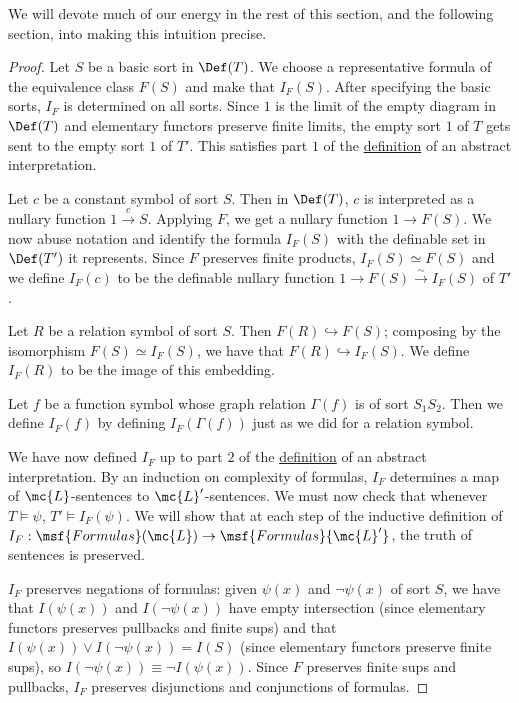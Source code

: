 \documentclass[11pt]{article}
\begin{document}
We will devote much of our energy in the rest of this section, and the following section, into making this intuition precise.


\begin{proof}
  Let $S$ be a basic sort in $\Def(T)$. We choose a representative formula of the equivalence class $F(S)$ and make that $I_F(S)$. After specifying the basic sorts, $I_F$ is determined on all sorts. Since $1$ is the limit of the empty diagram in $\Def(T)$ and elementary functors preserve finite limits, the empty sort $1$ of $T$ gets sent to the empty sort $1$ of $T'$. This satisfies part $1$ of the \hyperref[def-abstract-interpretation]{definition} of an abstract interpretation.

  Let $c$ be a constant symbol of sort $S$. Then in $\Def(T)$, $c$ is interpreted as a nullary function $1 \overset{c}{\to} S$. Applying $F$, we get a nullary function $1 \to F(S)$. We now abuse notation and identify the formula $I_F(S)$ with the definable set in $\Def(T')$ it represents. Since $F$ preserves finite products, $I_F(S) \simeq F(S)$ and we define $I_F(c)$ to be the definable nullary function $1 \to F(S) \overset{\sim}{\to} I_F(S)$ of $T'$.

  Let $R$ be a relation symbol of sort $S$. Then $F(R) \hookrightarrow F(S)$; composing by the isomorphism $F(S) \simeq I_F(S)$, we have that $F(R) \hookrightarrow I_F(S)$. We define $I_F(R)$ to be the image of this embedding.

  Let $f$ be a function symbol whose graph relation $\Gamma(f)$ is of sort $S_1S_2$. Then we define $I_F(f)$ by defining $I_F(\Gamma(f))$ just as we did for a relation symbol.

  We have now defined $I_F$ up to part $2$ of the \hyperref[def-abstract-interpretation]{definition} of an abstract interpretation. By an induction on complexity of formulas, $I_F$ determines a map of $\mc{L}$-sentences to $\mc{L}'$-sentences. We must now check that whenever $T \models \psi$, $T' \models I_F(\psi)$. We will show that at each step of the inductive definition of $I_F : \msf{Formulas}(\mc{L}) \to \msf{Formulas}{\mc{L}'}$, the truth of sentences is preserved.

  $I_F$ preserves negations of formulas: given $\psi(x)$ and $\neg \psi(x)$ of sort $S$, we have that $I(\psi(x))$ and $I(\neg\psi(x))$ have empty intersection (since elementary functors preserves pullbacks and finite sups) and that $I(\psi(x))\lor I(\neg\psi(x)) = I(S)$ (since elementary functors preserve finite sups), so $I(\neg \psi(x)) \equiv \neg I(\psi(x))$. Since $F$ preserves finite sups and pullbacks, $I_F$ preserves disjunctions and conjunctions of formulas.


\end{proof}
\end{document}
